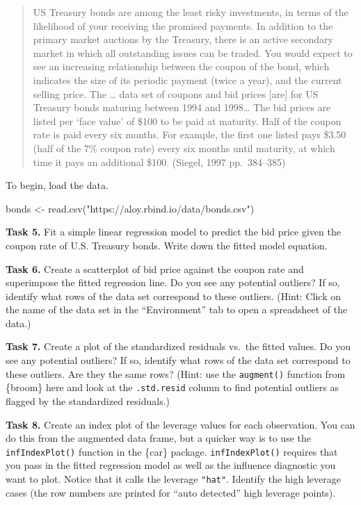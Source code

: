 \documentclass[
  letterpaper,
  DIV=11,
  numbers=noendperiod]{scrartcl}
\newenvironment{Shaded}{\begin{snugshade}}{\end{snugshade}}
\newcommand{\FunctionTok}[1]{\textcolor[rgb]{0.28,0.35,0.67}{#1}}
\newcommand{\NormalTok}[1]{\textcolor[rgb]{0.00,0.23,0.31}{#1}}
\newcommand{\OtherTok}[1]{\textcolor[rgb]{0.00,0.23,0.31}{#1}}
\newcommand{\StringTok}[1]{\textcolor[rgb]{0.13,0.47,0.30}{#1}}
\begin{document}
\begin{quote}
US Treasury bonds are among the least risky investments, in terms of the
likelihood of your receiving the promised payments. In addition to the
primary market auctions by the Treasury, there is an active secondary
market in which all outstanding issues can be traded. You would expect
to see an increasing relationship between the coupon of the bond, which
indicates the size of its periodic payment (twice a year), and the
current selling price. The \ldots{} data set of coupons and bid prices
{[}are{]} for US Treasury bonds maturing between 1994 and 1998\ldots{}
The bid prices are listed per `face value' of \$100 to be paid at
maturity. Half of the coupon rate is paid every six months. For example,
the first one listed pays \$3.50 (half of the 7\% coupon rate) every six
months until maturity, at which time it pays an additional \$100.
(Siegel, 1997 pp.~384--385)
\end{quote}

To begin, load the data.

\begin{Shaded}
\begin{Highlighting}[]
\NormalTok{bonds }\OtherTok{\textless{}{-}} \FunctionTok{read.csv}\NormalTok{(}\StringTok{"https://aloy.rbind.io/data/bonds.csv"}\NormalTok{)}
\end{Highlighting}
\end{Shaded}

\textbf{Task 5.} Fit a simple linear regression model to predict the bid
price given the coupon rate of U.S. Treasury bonds. Write down the
fitted model equation.

\textbf{Task 6.} Create a scatterplot of bid price against the coupon
rate and superimpose the fitted regression line. Do you see any
potential outliers? If so, identify what rows of the data set correspond
to these outliers. (Hint: Click on the name of the data set in the
``Environment'' tab to open a spreadsheet of the data.)

\textbf{Task 7.} Create a plot of the standardized residuals vs.~the
fitted values. Do you see any potential outliers? If so, identify what
rows of the data set correspond to these outliers. Are they the same
rows? (Hint: use the \texttt{augment()} function from \{broom\} here and
look at the \texttt{.std.resid} column to find potential outliers as
flagged by the standardized residuals.)

\textbf{Task 8.} Create an index plot of the leverage values for each
observation. You can do this from the augmented data frame, but a
quicker way is to use the \texttt{infIndexPlot()} function in the
\{car\} package. \texttt{infIndexPlot()} requires that you pass in the
fitted regression model as well as the influence diagnostic you want to
plot. Notice that it calls the leverage \texttt{"hat"}. Identify the
high leverage cases (the row numbers are printed for ``auto detected''
high leverage points).
\end{document}

